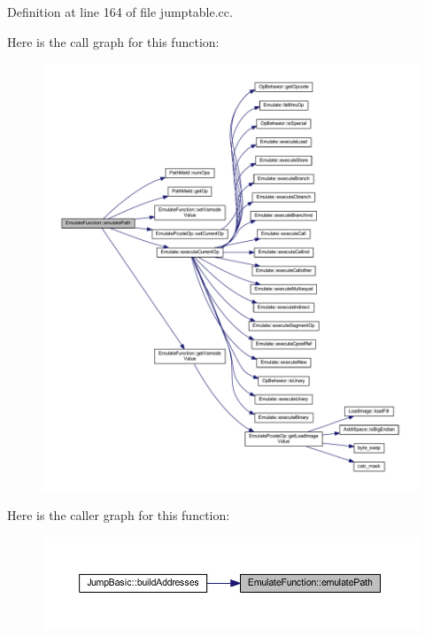 Definition at line 164 of file jumptable.\+cc.

Here is the call graph for this function\+:
\nopagebreak
\begin{figure}[H]
\begin{center}
\leavevmode
\includegraphics[width=350pt]{class_emulate_function_a0b6a72cd2a09edc2f9ca29503c435259_cgraph}
\end{center}
\end{figure}
Here is the caller graph for this function\+:
\nopagebreak
\begin{figure}[H]
\begin{center}
\leavevmode
\includegraphics[width=350pt]{class_emulate_function_a0b6a72cd2a09edc2f9ca29503c435259_icgraph}
\end{center}
\end{figure}
\mbox{\label{class_emulate_function_aea3a1fca2e8073ab6e7bcff5f05a74ca}} 
